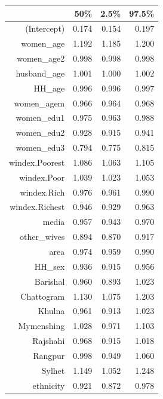 \begin{table}[ht]
\centering
\begin{tabular}{rrrr}
  \hline
 & 50\% & 2.5\% & 97.5\% \\ 
  \hline
(Intercept) & 0.174 & 0.154 & 0.197 \\ 
  women\_age & 1.192 & 1.185 & 1.200 \\ 
  women\_age2 & 0.998 & 0.998 & 0.998 \\ 
  husband\_age & 1.001 & 1.000 & 1.002 \\ 
  HH\_age & 0.996 & 0.996 & 0.997 \\ 
  women\_agem & 0.966 & 0.964 & 0.968 \\ 
  women\_edu1 & 0.975 & 0.963 & 0.988 \\ 
  women\_edu2 & 0.928 & 0.915 & 0.941 \\ 
  women\_edu3 & 0.794 & 0.775 & 0.815 \\ 
  windex.Poorest & 1.086 & 1.063 & 1.105 \\ 
  windex.Poor & 1.039 & 1.023 & 1.053 \\ 
  windex.Rich & 0.976 & 0.961 & 0.990 \\ 
  windex.Richest & 0.946 & 0.929 & 0.963 \\ 
  media & 0.957 & 0.943 & 0.970 \\ 
  other\_wives & 0.894 & 0.870 & 0.917 \\ 
  area & 0.974 & 0.959 & 0.990 \\ 
  HH\_sex & 0.936 & 0.915 & 0.956 \\ 
  Barishal & 0.960 & 0.893 & 1.023 \\ 
  Chattogram & 1.130 & 1.075 & 1.203 \\ 
  Khulna & 0.961 & 0.913 & 1.023 \\ 
  Mymenshing & 1.028 & 0.971 & 1.103 \\ 
  Rajshahi & 0.968 & 0.915 & 1.018 \\ 
  Rangpur & 0.998 & 0.949 & 1.060 \\ 
  Sylhet & 1.149 & 1.052 & 1.248 \\ 
  ethnicity & 0.921 & 0.872 & 0.978 \\ 
   \hline
\end{tabular}
\end{table}
